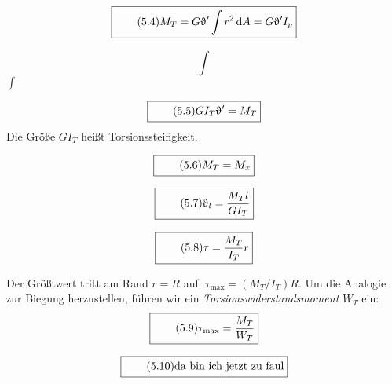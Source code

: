 \documentclass[11pt]{article}
\newcommand{\1}{ {\mathds{1}} }
\newcommand{\td}{\,\text{d}}
\renewcommand{\theta  }{\upvartheta}
\begin{document}
		\begin{equation}
			\boxed{
				\tag{5.4}
				\begin{split}
					M_T = G\theta' \displaystyle\int r^2 \td A = G \theta' I_p
				\end{split}
			}
		\end{equation}
		
		\[\int\]
		$\int $
		
		\begin{equation}
			\boxed{
				\tag{5.5}
				\begin{split}
					GI_T \theta' = M_T
				\end{split}
			}
		\end{equation}
		Die Größe $GI_T$ heißt Torsionssteifigkeit.

		\begin{equation}
			\boxed{
				\tag{5.6}
				\begin{split}
					M_T = M_x
				\end{split}
			}
		\end{equation}

		\begin{equation}
			\boxed{
				\tag{5.7}
				\begin{split}
					\theta_l = \frac{M_T l}{GI_T}
				\end{split}
			}
		\end{equation}

		\begin{equation}
			\boxed{
				\tag{5.8}
				\begin{split}
					\tau = \frac{M_T}{I_T}r
				\end{split}
			}
		\end{equation}
		
		\pagebreak[0]
		Der Größtwert tritt am Rand $ r = R $ auf: $ \tau_{\text{max}} = \left( M_T / I_T \right) R $.
		Um
die Analogie zur Biegung herzustellen, führen wir ein \textit{Torsionswiderstandsmoment} $ W_T $ ein:
		\nopagebreak
		\begin{equation}
			\boxed{
				\tag{5.9}
				\begin{split}
					\tau_{\text{max}} = \frac{M_T}{W_T}
				\end{split}
			}
		\end{equation}

		\begin{equation}
			\boxed{
				\tag{5.10}
				\begin{split}
					\text{da bin ich jetzt zu faul}
				\end{split}
			}
		\end{equation}
\end{document}

